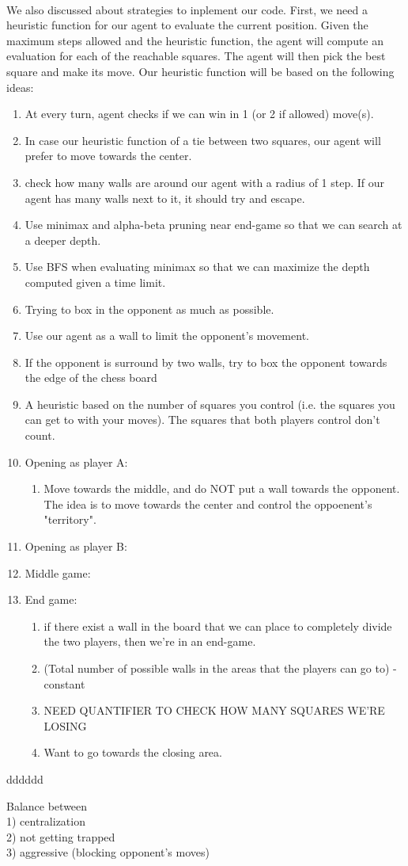 \documentclass[12pt,a4paper]{article}
\begin{document}
\paragraph{} We also discussed about strategies to inplement our code. First, we need a 
heuristic function for our agent to evaluate the current position. Given the maximum steps 
allowed and the heuristic function, the agent will compute an evaluation for each of the 
reachable squares. The agent will then pick the best square and make its move. Our heuristic 
function will be based on the following ideas:
\begin{enumerate}
    \item At every turn, agent checks if we can win in 1 (or 2 if allowed) move(s). 
    \item In case our heuristic function of a tie between two squares, our agent will prefer to move towards the center.
    \item check how many walls are around our agent with a radius of 1 step. 
    If our agent has many walls next to it, it should try and escape.
    \item Use minimax and alpha-beta pruning near end-game so that we can search at a deeper depth. 
    \item Use BFS when evaluating minimax so that we can maximize the depth computed given a time limit. 
    \item Trying to box in the opponent as much as possible.
    \item Use our agent as a wall to limit the opponent's movement.
    \item If the opponent is surround by two walls, try to box the opponent towards the edge of the chess board
    \item A heuristic based on the number of squares you control (i.e. the squares you can 
    get to with your moves). The squares that both players control don't count. 
    \item Opening as player A:
    \begin{enumerate}
        \item Move towards the middle, and do NOT put a wall towards the opponent. 
        The idea is to move towards the center and control the oppoenent's "territory". 
    \end{enumerate}
    \item Opening as player B: 
    \item Middle game: 
    \item End game: 
    \begin{enumerate}
        \item if there exist a wall in the board that we can place to completely divide the two players, then we're 
        in an end-game.
        \item (Total number of possible walls in the areas that the players can go to) - constant
        \item NEED QUANTIFIER TO CHECK HOW MANY SQUARES WE'RE LOSING
        \item Want to go towards the closing area.
    \end{enumerate}
\end{enumerate}
dddddd


Balance between \\
1) centralization\\
2) not getting trapped\\
3) aggressive (blocking opponent's moves)\\
\end{document}
